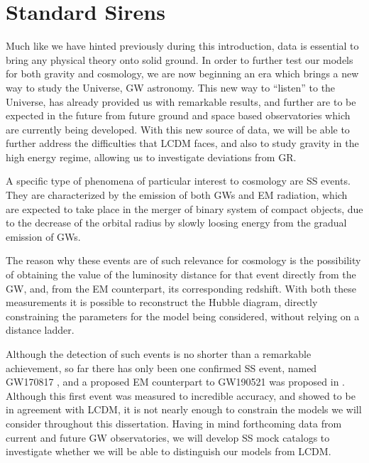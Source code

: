 \section{Standard Sirens}
\label{sec:standard-sirens}

Much like we have hinted previously during this introduction, data is essential to bring any physical theory onto solid ground. In order to further test our models for both gravity and cosmology, we are now beginning an era which brings a new way to study the Universe, \gls{GW} astronomy. This new way to ``listen'' to the Universe, has already provided us with remarkable results, and further are to be expected in the future from future ground and space based observatories which are currently being developed. With this new source of data, we will be able to further address the difficulties that \gls{LCDM} faces, and also to study gravity in the high energy regime, allowing us to investigate deviations from \gls{GR}.

A specific type of phenomena of particular interest to cosmology are \gls{SS} events. They are characterized by the emission of both \glspl{GW} and \gls{EM} radiation, which are expected to take place in the merger of binary system of compact objects, due to the decrease of the orbital radius by slowly loosing energy from the gradual emission of \glspl{GW}.

The reason why these events are of such relevance for cosmology is the possibility of obtaining the value of the luminosity distance for that event directly from the \gls{GW}, and, from the \gls{EM} counterpart, its corresponding redshift. With both these measurements it is possible to reconstruct the Hubble diagram, directly constraining the parameters for the model being considered, without relying on a distance ladder.

Although the detection of such events is no shorter than a remarkable achievement, so far there has only been one confirmed \gls{SS} event, named GW170817 \cite{GW170817}, and a proposed \gls{EM} counterpart to GW190521 \cite{GW190521} was proposed in \cite{GW190521-EM}. Although this first event was measured to incredible accuracy, and showed to be in agreement with \gls{LCDM}, it is not nearly enough to constrain the models we will consider throughout this dissertation. Having in mind forthcoming data from current and future \gls{GW} observatories, we will develop \gls{SS} mock catalogs to investigate whether we will be able to distinguish our models from \gls{LCDM}.



